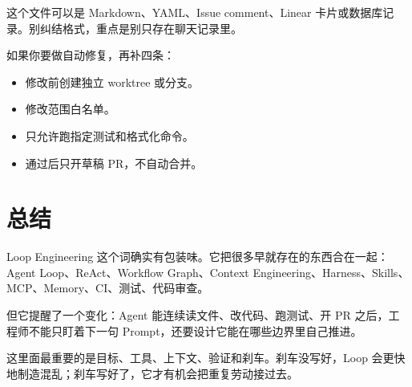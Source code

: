 \documentclass[10pt,a4paper]{ctexart}
\begin{document}
这个文件可以是 Markdown、YAML、Issue comment、Linear 卡片或数据库记录。别纠结格式，重点是别只存在聊天记录里。



如果你要做自动修复，再补四条：


\begin{itemize}[itemsep=2pt, topsep=4pt]
  \item 修改前创建独立 worktree 或分支。
  \item 修改范围白名单。
  \item 只允许跑指定测试和格式化命令。
  \item 通过后只开草稿 PR，不自动合并。
\end{itemize}


\section{总结}


Loop Engineering 这个词确实有包装味。它把很多早就存在的东西合在一起：Agent Loop、ReAct、Workflow Graph、Context Engineering、Harness、Skills、MCP、Memory、CI、测试、代码审查。



但它提醒了一个变化：Agent 能连续读文件、改代码、跑测试、开 PR 之后，工程师不能只盯着下一句 Prompt，还要设计它能在哪些边界里自己推进。



这里面最重要的是目标、工具、上下文、验证和刹车。刹车没写好，Loop 会更快地制造混乱；刹车写好了，它才有机会把重复劳动接过去。
\end{document}
